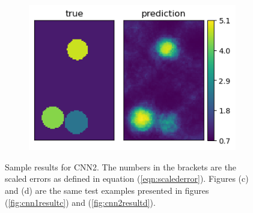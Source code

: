\documentclass[12pt]{article}
\newcommand{\nhghalfwidth}{0.48\linewidth}
\newcommand{\nhgtotalheight}{4cm}
\begin{document}
\begin{figure}[!h]
\begin{subfigure}[c]{\nhghalfwidth}
  \end{subfigure}
  \begin{subfigure}[c]{\nhghalfwidth}
    \centering
    \includegraphics[totalheight=\nhgtotalheight]{Figures/Results2/ex4/mu.png}
  \end{subfigure}
\caption{\label{fig:cnn2result} Sample results for CNN2. The numbers in the brackets are the scaled errors as defined in equation (\ref{eqn:scalederror}). Figures (c) and (d) are the same test examples presented in figures (\ref{fig:cnn1resultc}) and (\ref{fig:cnn2resultd}).}  
\end{figure}
%
\end{document}
